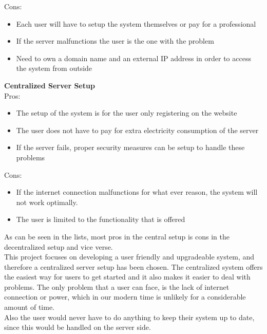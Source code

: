 Cons:
\begin{itemize}
	\item Each user will have to setup the system themselves or pay for a professional
  \item If the server malfunctions the user is the one with the problem
  \item Need to own a domain name and an external IP address in order to access the system from outside
\end{itemize}

\textbf{Centralized Server Setup}\\
Pros:
\begin{itemize}
	\item The setup of the system is for the user only registering on the website
	\item The user does not have to pay for extra electricity consumption of the server
	\item If the server fails, proper security measures can be setup to handle these problems
\end{itemize}

Cons:
\begin{itemize}
	\item If the internet connection malfunctions for what ever reason, the system will not work optimally.
  \item The user is limited to the functionality that is offered
\end{itemize}

As can be seen in the lists, most pros in the central setup is cons in the decentralized setup and vice verse.\\
This project focuses on developing a user friendly and upgradeable system, and therefore a centralized server setup has been chosen. The centralized system offers the easiest way for users to get started and it also makes it easier to deal with problems. The only problem that a user can face, is the lack of internet connection or power, which in our modern time is unlikely for a considerable amount of time.\\
Also the user would never have to do anything to keep their system up to date, since this would be handled on the server side.
